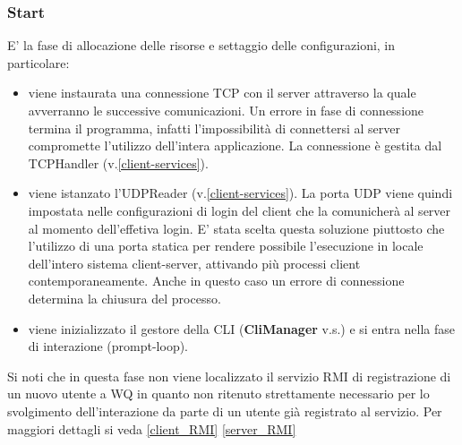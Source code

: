\documentclass{article}
\begin{document}
    \subsubsection{Start} E' la fase di allocazione delle risorse e settaggio delle configurazioni, in particolare:
    \begin{itemize}
        \item viene instaurata una connessione TCP con il server attraverso la quale avverranno le successive comunicazioni. Un errore in fase di connessione termina il programma, infatti l'impossibilità di connettersi al server compromette l'utilizzo dell'intera applicazione. La connessione è gestita dal TCPHandler (v.\ref{client-services}).
        \item viene istanzato l'UDPReader (v.\ref{client-services}). La porta UDP viene quindi impostata nelle configurazioni di login del client che la comunicherà al server al momento dell'effetiva login. E' stata scelta questa soluzione piuttosto che l'utilizzo di una porta statica per rendere possibile l'esecuzione in locale dell'intero sistema client-server, attivando più processi client contemporaneamente. Anche in questo caso un errore di connessione determina la chiusura del processo.
        \item viene inizializzato il gestore della CLI (\textbf{CliManager} v.s.) e si entra nella fase di interazione (prompt-loop).
    \end{itemize}
    Si noti che in questa fase non viene localizzato il servizio RMI di registrazione di un nuovo utente a WQ in quanto non ritenuto strettamente necessario per lo svolgimento dell'interazione da parte di un utente già registrato al servizio. Per maggiori dettagli si veda \ref{client_RMI} \ref{server_RMI}
\end{document}
